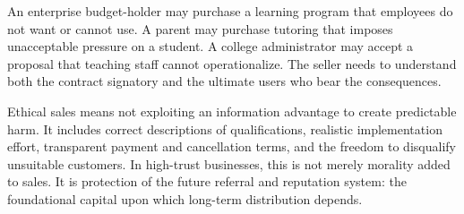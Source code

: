 An enterprise budget-holder may purchase a learning program that employees do not want or cannot use. A parent may purchase tutoring that imposes unacceptable pressure on a student. A college administrator may accept a proposal that teaching staff cannot operationalize. The seller needs to understand both the contract signatory and the ultimate users who bear the consequences.

Ethical sales means not exploiting an information advantage to create predictable harm. It includes correct descriptions of qualifications, realistic implementation effort, transparent payment and cancellation terms, and the freedom to disqualify unsuitable customers. In high-trust businesses, this is not merely morality added to sales. It is protection of the future referral and reputation system: the foundational capital upon which long-term distribution depends.
